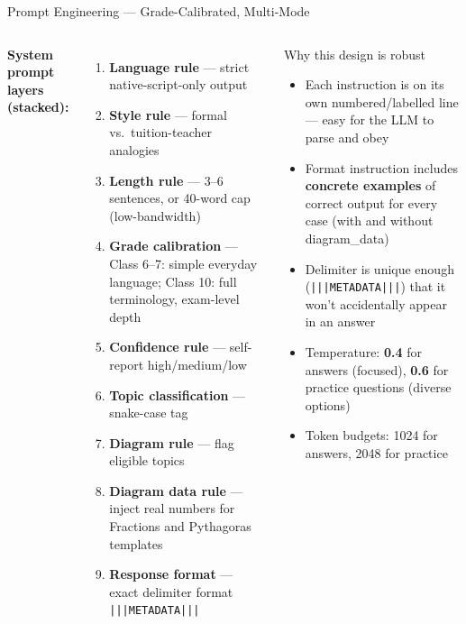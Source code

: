 \documentclass[aspectratio=169, 12pt]{beamer}
\begin{document}
\begin{frame}{Prompt Engineering — Grade-Calibrated, Multi-Mode}
  \begin{columns}[T]
      \textbf{System prompt layers (stacked):}
      \begin{enumerate}\small
        \item \textbf{Language rule} --- strict native-script-only output
        \item \textbf{Style rule} --- formal vs.\ tuition-teacher analogies
        \item \textbf{Length rule} --- 3--6 sentences, or 40-word cap
              (low-bandwidth)
        \item \textbf{Grade calibration} --- Class 6--7: simple everyday
              language; Class 10: full terminology, exam-level depth
        \item \textbf{Confidence rule} --- self-report high/medium/low
        \item \textbf{Topic classification} --- snake-case tag
        \item \textbf{Diagram rule} --- flag eligible topics
        \item \textbf{Diagram data rule} --- inject real numbers for
              Fractions and Pythagoras templates
        \item \textbf{Response format} --- exact delimiter format
              \texttt{|||METADATA|||}
      \end{enumerate}
      \begin{block}{Why this design is robust}
        \begin{itemize}\small
          \item Each instruction is on its own numbered/labelled line
                --- easy for the LLM to parse and obey
          \item Format instruction includes \textbf{concrete examples}
                of correct output for every case (with and without
                diagram\_data)
          \item Delimiter is unique enough
                (\texttt{|||METADATA|||}) that it won't accidentally
                appear in an answer
          \item Temperature: \textbf{0.4} for answers (focused),
                \textbf{0.6} for practice questions (diverse options)
          \item Token budgets: 1024 for answers, 2048 for practice
        \end{itemize}
      \end{block}
  \end{columns}
\end{frame}
\end{document}
